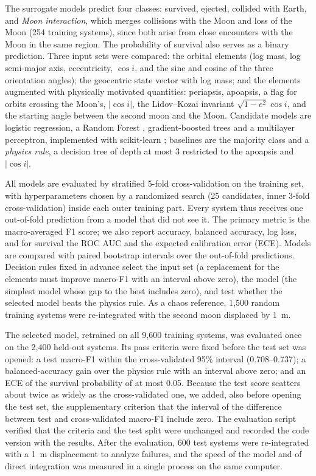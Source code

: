 \documentclass[twocolumn]{aastex631}
\begin{document}
The surrogate models predict four classes: survived, ejected, collided with Earth, and
\emph{Moon interaction}, which merges collisions with the Moon and loss of the Moon (254 training
systems), since both arise from close encounters with the Moon in the same region. The probability
of survival also serves as a binary prediction. Three input sets were compared: the orbital
elements (log mass, log semi-major axis, eccentricity, $\cos i$, and the sine and cosine of the
three orientation angles); the geocentric state vector with log mass; and the elements augmented
with physically motivated quantities: periapsis, apoapsis, a flag for orbits crossing the Moon's,
$|\cos i|$, the Lidov--Kozai invariant $\sqrt{1-e^2}\cos i$, and the starting angle between the
second moon and the Moon. Candidate models are logistic regression, a Random Forest
\citep{Breiman2001}, gradient-boosted trees \citep[XGBoost;][]{Chen2016} and a multilayer
perceptron, implemented with scikit-learn \citep{Pedregosa2011}; baselines are the majority class
and a \emph{physics rule}, a decision tree of depth at most 3 restricted to the apoapsis and
$|\cos i|$.

All models are evaluated by stratified 5-fold cross-validation on the training set, with
hyperparameters chosen by a randomized search (25 candidates, inner 3-fold cross-validation) inside
each outer training part. Every system thus receives one out-of-fold prediction from a model that
did not see it. The primary metric is the macro-averaged F1 score; we also report accuracy,
balanced accuracy, log loss, and for survival the ROC AUC and the expected calibration error (ECE).
Models are compared with paired bootstrap intervals over the out-of-fold predictions. Decision
rules fixed in advance select the input set (a replacement for the elements must improve macro-F1
with an interval above zero), the model (the simplest model whose gap to the best includes zero),
and test whether the selected model beats the physics rule. As a chaos reference, 1,500 random
training systems were re-integrated with the second moon displaced by 1~m.

The selected model, retrained on all 9,600 training systems, was evaluated once on the 2,400
held-out systems. Its pass criteria were fixed before the test set was opened: a test macro-F1
within the cross-validated 95\% interval (0.708--0.737); a balanced-accuracy gain over the physics
rule with an interval above zero; and an ECE of the survival probability of at most 0.05. Because the test score
scatters about twice as widely as the cross-validated one, we added, also before opening the test
set, the supplementary criterion that the interval of the difference between test and
cross-validated macro-F1 include zero. The evaluation script verified that the criteria and the test
split were unchanged and recorded the code version with the results. After the evaluation, 600 test
systems were re-integrated with a 1~m displacement to analyze failures, and the speed of the model
and of direct integration was measured in a single process on the same computer.
\end{document}
